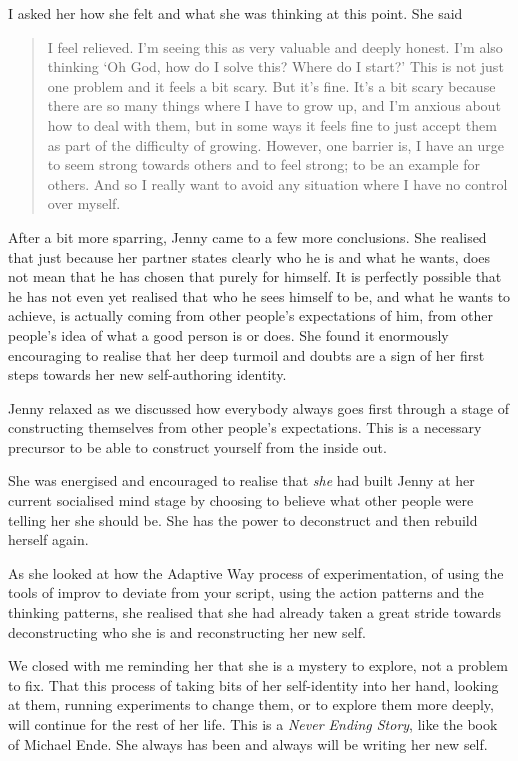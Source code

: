 \begin{longstoryblock}
I asked her how she felt and what she was thinking at this point. She said \begin{quote} 
I feel relieved. I'm seeing this as very valuable and deeply honest. I'm also thinking ‘Oh God, how do I solve this? Where do I start?’ This is not just one problem and it feels a bit scary. But it's fine. It's a bit scary because there are so many things where I have to grow up, and I'm anxious about how to deal with them, but in some ways it feels fine to just accept them as part of the difficulty of growing. However, one barrier is, I have an urge to seem strong towards others and to feel strong; to be an example for others. And so I really want to avoid any situation where I have no control over myself.
\end{quote} 


After a bit more sparring, Jenny came to a few more conclusions. She realised that just because her partner states clearly who he is and what he wants, does not mean that he has chosen that purely for himself. It is perfectly possible that he has not even yet realised that who he sees himself to be, and what he wants to achieve, is actually coming from other people's expectations of him, from other people's idea of what a good person is or does. She found it enormously encouraging to realise that her deep turmoil and doubts are a sign of her first steps towards her new self-authoring identity.


Jenny relaxed as we discussed how everybody always goes first through a stage of constructing themselves from other people's expectations. This is a necessary precursor to be able to construct yourself from the inside out.


She was energised and encouraged to realise that \emph{she} had built Jenny at her current socialised mind stage by choosing to believe what other people were telling her she should be. She has the power to deconstruct and then rebuild herself again.


As she looked at how the Adaptive Way process of experimentation, of using the tools of improv to deviate from your script, using the action patterns and the thinking patterns, she realised that she had already taken a great stride towards deconstructing who she is and reconstructing her new self. 


We closed with me reminding her that she is a mystery to explore, not a problem to fix. That this process of taking bits of her self-identity into her hand, looking at them, running experiments to change them, or to explore them more deeply, will continue for the rest of her life. This is a \emph{Never Ending Story}, like the book of Michael Ende\cite{ende-never}. She always has been and always will be writing her new self.



\end{longstoryblock}
